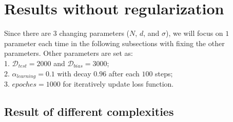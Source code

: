 \documentclass{article}
\begin{document}



\section{Results without regularization}

Since there are $3$ changing parameters ($N$, $d$, and $\sigma$), we will focus on $1$ parameter each time in the following subsections with fixing the other parameters. Other parameters are set as:\\
1. $\mathcal{D}_{test} = 2000$ and $\mathcal{D}_{bias} = 3000$;\\
2. $\alpha_{learning} = 0.1$ with decay $0.96$ after each $100$ steps;\\
3. $epoches = 1000$ for iteratively update loss function.

\subsection{Result of different complexities}
\end{document}
